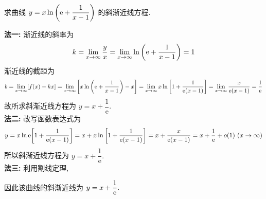 \begin{example}[2023 数一]
    求曲线 $y=x\ln\qty(\mathrm{e}+\dfrac{1}{x-1})$ 的斜渐近线方程.
\end{example}
\begin{solution}
    \textbf{法一: }渐近线的斜率为 $$k=\lim_{x\to\infty}\dfrac{y}{x}=\lim_{x\to\infty}\ln\qty(\mathrm{e}+\dfrac{1}{x-1})=1$$
    渐近线的截距为 $$b=\lim_{x\to\infty}[f(x)-kx]=\lim_{x\to\infty}\qty[x\ln\qty(\mathrm{e}+\dfrac{1}{x-1})-x]=\lim_{x\to\infty}x\ln\qty[1+\dfrac{1}{\mathrm{e}(x-1)}]=\lim_{x\to\infty}\dfrac{x}{\mathrm{e}(x-1)}=\dfrac{1}{\mathrm{e}}$$
    故所求斜渐近线方程为 $y=x+\dfrac{1}{\mathrm{e}}$.\\
    \textbf{法二: }改写函数表达式为 $$y=x\ln\mathrm{e}\qty[1+\dfrac{1}{\mathrm{e}(x-1)}]=x+x\ln\qty[1+\dfrac{1}{\mathrm{e}(x-1)}]=x+\dfrac{x}{\mathrm{e}(x-1)}=x+\dfrac{1}{\mathrm{e}}+o(1)~  (x\to\infty)$$
    所以斜渐近线方程为 $y=x+\dfrac{1}{\mathrm{e}}.$\\
    \textbf{法三: }利用割线定理,
    因此该曲线的斜渐近线为 $y=x+\dfrac{1}{\mathrm{e}}.$
\end{solution}
